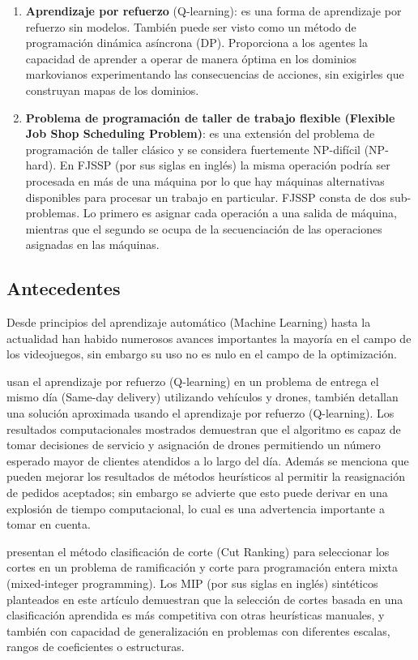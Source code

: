 \documentclass[letterpaper, 10 pt]{article}
\begin{document}
\begin{enumerate}
	\item  \textbf{Aprendizaje por refuerzo} (Q-learning): \cite{watkins1992q} es una forma de aprendizaje por refuerzo sin modelos. También puede ser visto como un método de programación dinámica asíncrona (DP). Proporciona a los agentes la capacidad de aprender a operar de manera óptima en los dominios markovianos experimentando las consecuencias de acciones, sin exigirles que construyan mapas de los dominios.
	\item \textbf{Problema de programación de taller de trabajo flexible
	(Flexible Job Shop Scheduling Problem)}: \cite{pezzella2008genetic} es una extensión del problema de programación de taller clásico y se considera fuertemente NP-difícil (NP-hard). En FJSSP (por sus siglas en inglés) la misma operación podría ser procesada en más de una máquina por lo que hay máquinas alternativas disponibles para procesar un trabajo en particular. FJSSP consta de dos sub-problemas. Lo primero es asignar cada operación a una salida de máquina, mientras que el segundo se ocupa de la secuenciación de las operaciones asignadas en las máquinas.
\end{enumerate}

\subsection{Antecedentes}
Desde principios del aprendizaje automático (Machine Learning) hasta la actualidad han habido numerosos avances importantes la mayoría en el campo de los videojuegos, sin embargo su uso no es nulo en el campo de la optimización.

\cite{CHEN2022939} usan el aprendizaje por refuerzo (Q-learning) en un problema de entrega el mismo día (Same-day delivery) utilizando vehículos y drones, también detallan una solución aproximada usando el aprendizaje por refuerzo (Q-learning). Los resultados computacionales mostrados demuestran que el algoritmo es capaz de tomar decisiones de servicio y asignación de drones permitiendo un número esperado mayor de clientes atendidos a lo largo del día. Además se menciona que pueden mejorar los resultados de métodos heurísticos al permitir la reasignación de pedidos aceptados; sin embargo se advierte que esto puede derivar en una explosión de tiempo computacional, lo cual es una advertencia importante a tomar en cuenta.

 \cite{HUANG2022108353} presentan el método clasificación de corte (Cut Ranking) para seleccionar los cortes en un problema de ramificación y corte para programación entera mixta (mixed-integer programming).  Los MIP (por sus siglas en inglés) sintéticos planteados en este artículo demuestran que la selección de cortes basada en una clasificación aprendida es más competitiva con otras heurísticas manuales,  y también con capacidad de generalización en problemas con diferentes escalas, rangos de coeficientes o estructuras.
\end{document}
